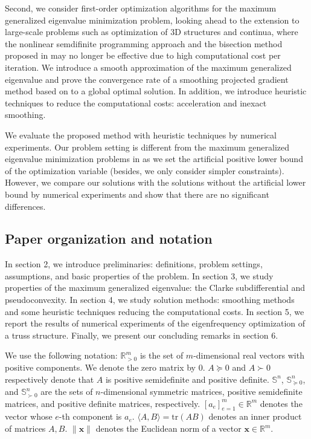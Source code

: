 \documentclass[sn-mathphys,Numbered]{sn-jnl}%
\theoremstyle{thmstyleone}%
\theoremstyle{thmstyletwo}%
\theoremstyle{thmstylethree}%
\def\rm{\mathbb{R}^m}
\begin{document}
Second, we consider first-order optimization algorithms for the maximum generalized eigenvalue minimization problem, looking ahead to the extension to large-scale problems such as optimization of 3D structures and continua, where the nonlinear semdifinite programming approach and the bisection method proposed in \cite{achtziger07siam} may no longer be effective due to high computational cost per iteration. We introduce a smooth approximation of the maximum generalized eigenvalue and prove the convergence rate of a smoothing projected gradient method based on \cite{bian20,zhang09} to a global optimal solution. In addition, we introduce heuristic techniques to reduce the computational costs: acceleration and inexact smoothing.

We evaluate the proposed method with heuristic techniques by numerical experiments. Our problem setting is different from the maximum generalized eigenvalue minimization problems in \cite{achtziger07siam} as we set the artificial positive lower bound of the optimization variable (besides, we only consider simpler constraints). However, we compare our solutions with the solutions without the artificial lower bound by numerical experiments and show that there are no significant differences.

\subsection{Paper organization and notation}

In section 2, we introduce preliminaries: definitions, problem settings, assumptions, and basic properties of the problem. In section 3, we study properties of the maximum generalized eigenvalue: the Clarke subdifferential and pseudoconvexity. In section 4, we study solution methods: smoothing methods and some heuristic techniques reducing the computational costs. In section 5, we report the results of numerical experiments of the eigenfrequency optimization of a truss structure. Finally, we present our concluding remarks in section 6. 

We use the following notation: $\mathbb{R}^m_{>0}$ is the set of $m$-dimensional real vectors with positive components. We denote the zero matrix by $0$. $A\succeq 0$ and $A\succ 0$ respectively denote that $A$ is positive semidefinite and positive definite. $\mathbb{S}^n$, $\mathbb{S}^n_{\succeq 0}$, and $\mathbb{S}^n_{\succ 0}$ are the sets of $n$-dimensional symmetric matrices, positive semidefinite matrices, and positive definite matrices, respectively. $[a_e]_{e=1}^m\in\rm$ denotes the vector whose $e$-th component is $a_e$. $\langle A,B \rangle = \mathrm{tr}(AB)$ denotes an inner product of matrices $A,B$. $\|\bm{x}\|$ denotes the Euclidean norm of a vector $\bm{x}\in\rm$.
\end{document}
